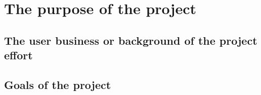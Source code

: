 \section{The purpose of the project}
\subsection{The user business or background of the project effort}
\subsection{Goals of the project}